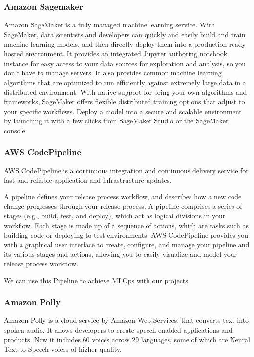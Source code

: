 \subsubsection{\textbf{Amazon Sagemaker}}
Amazon SageMaker is a fully managed machine learning service. With SageMaker, data scientists and developers can quickly and easily build and train machine learning models, and then directly deploy them into a production-ready hosted environment. It provides an integrated Jupyter authoring notebook instance for easy access to your data sources for exploration and analysis, so you don't have to manage servers. It also provides common machine learning algorithms that are optimized to run efficiently against extremely large data in a distributed environment. With native support for bring-your-own-algorithms and frameworks, SageMaker offers flexible distributed training options that adjust to your specific workflows. Deploy a model into a secure and scalable environment by launching it with a few clicks from SageMaker Studio or the SageMaker console. \\

\subsubsection{\textbf{AWS CodePipeline}}
AWS CodePipeline is a continuous integration and continuous delivery service for fast and reliable application and infrastructure updates.

A pipeline defines your release process workflow, and describes how a new code change progresses through your release process. A pipeline comprises a series of stages (e.g., build, test, and deploy), which act as logical divisions in your workflow. Each stage is made up of a sequence of actions, which are tasks such as building code or deploying to test environments. AWS CodePipeline provides you with a graphical user interface to create, configure, and manage your pipeline and its various stages and actions, allowing you to easily visualize and model your release process workflow.

We can use this Pipeline to achieve MLOps with our projects\\

\subsubsection{\textbf{Amazon Polly}}
Amazon Polly is a cloud service by Amazon Web Services, that converts text into spoken audio. It allows developers to create speech-enabled applications and products. Now it includes 60 voices across 29 languages, some of which are Neural Text-to-Speech voices of higher quality.


